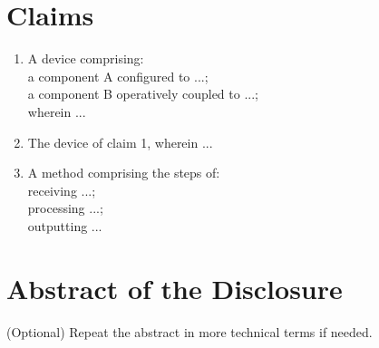 \documentclass[12pt]{article}
\begin{document}
\vspace{1em}
\section*{Claims}
\begin{enumerate}[label=\arabic*.]
    \item A device comprising: \\
    \quad a component A configured to ...; \\
    \quad a component B operatively coupled to ...; \\
    \quad wherein ...
    
    \item The device of claim 1, wherein ...
    
    \item A method comprising the steps of: \\
    \quad receiving ...; \\
    \quad processing ...; \\
    \quad outputting ...
\end{enumerate}

\vspace{1em}
\section*{Abstract of the Disclosure}
(Optional) Repeat the abstract in more technical terms if needed.
\end{document}
